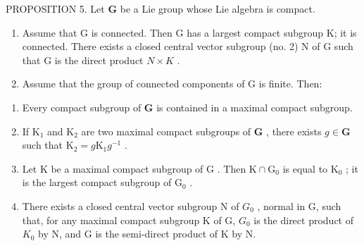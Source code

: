 PROPOSITION 5. Let \(\mathbf{G}\) be a Lie group whose Lie algebra is compact.

\begin{enumerate}
\def\labelenumi{\alph{enumi})}
\item
  Assume that G is connected. Then G has a largest compact subgroup K; it is connected. There exists a closed central vector subgroup (no. 2) N of G such that G is the direct product \(N \times K\) .
\item
  Assume that the group of connected components of G is finite. Then:
\end{enumerate}

\begin{enumerate}
\def\labelenumi{(\roman{enumi})}
\item
  Every compact subgroup of \(\mathbf{G}\) is contained in a maximal compact subgroup.
\item
  If \(\mathrm{K}_1\) and \(\mathrm{K}_2\) are two maximal compact subgroups of \(\mathbf{G}\) , there exists \(g \in \mathbf{G}\) such that \(\mathrm{K}_2 = g\mathrm{K}_1g^{-1}\) .
\item
  Let \(\mathrm{K}\) be a maximal compact subgroup of \(\mathrm{G}\) . Then \(\mathrm{K} \cap \mathrm{G}_0\) is equal to \(\mathrm{K}_0\) ; it is the largest compact subgroup of \(\mathrm{G}_0\) .
\item
  There exists a closed central vector subgroup N of \(G_{0}\) , normal in G, such that, for any maximal compact subgroup K of G, \(G_{0}\) is the direct product of \(K_{0}\) by N, and G is the semi-direct product of K by N.
\end{enumerate}

